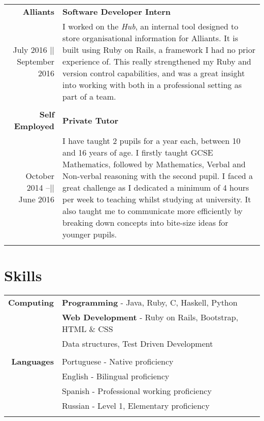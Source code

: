 \documentclass[a4paper,10pt]{article}
\begin{document}
	\begin{tabular}{ r |p{10cm}}
		
		\large{\textbf{Alliants}} & \textbf{Software Developer Intern}
		\\
		July 2016 || September 2016 & I worked on the \textit{Hub}, an internal tool designed to store organisational information for Alliants. It is built using Ruby on Rails, a framework I had no prior experience of. This really strengthened my Ruby and version control capabilities, and was a great insight into working with both in a professional setting as part of a team.
		\\\multicolumn{2}{c}{} \\
		
		\large{\textbf{Self Employed}} & \textbf{Private Tutor}
		 \\		
		 October 2014 –|| June 2016 & I have taught 2 pupils for a year each, between 10 and 16 years of age. I firstly taught GCSE Mathematics, followed by Mathematics, Verbal and Non-verbal reasoning with the second pupil. I faced a great challenge as I dedicated a minimum of 4 hours per week to teaching whilst studying at university. It also taught me to communicate more efficiently by breaking down concepts into bite-size ideas for younger pupils.
		\\\multicolumn{2}{c}{} \\

			
	\end{tabular}
	
	\section*{Skills}
	
	\begin{tabular}{r|p{12cm}}	
		\textbf{Computing}	 & \textbf{Programming} - Java, Ruby, C, Haskell, Python \\&
		\textbf{Web Development} - Ruby on Rails, Bootstrap, HTML \& CSS \\&
		Data structures, Test Driven Development
		 \\\multicolumn{2}{c}{} \\
		\textbf{Languages} & Portuguese - Native proficiency \\&
		English - Bilingual proficiency \\&
		Spanish - Professional working proficiency \\&
		Russian - Level 1, Elementary proficiency \\\multicolumn{2}{c}{} \\

		
	\end{tabular}
	
\end{document}

